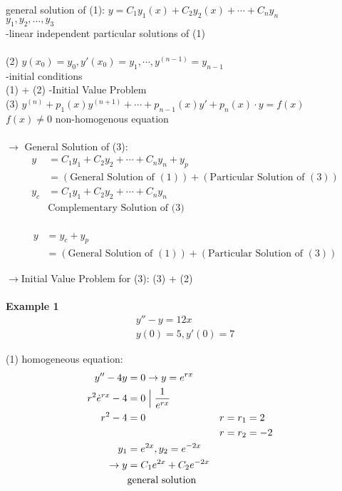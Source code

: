 \documentclass[10pt, letterpaper]{article}
\begin{document}
general solution of (1):
$y =C_1y_1(x) +C_2y_2(x) +\cdots +C_ny_n$\\
$y_1, y_2, \dots, y_3$\\
-linear independent particular solutions of (1)\\
\\
(2) $y(x_0) =y_0, y'(x_0)=y_1, \cdots, y^{(n-1)} =y_{n-1}$\\
-initial conditions\\
(1) + (2) -Initial Value Problem\\
(3) $y^{(n)} +p_1(x)y^{(n+1)} +\cdots +p_{n-1}(x)y' +p_n(x) \cdot y =f(x)$\\
$f(x) \neq 0$ non-homogenous equation\\
\\
$\rightarrow$ General Solution of (3):\\
\begin{align*}
y &= C_1y_1 +C_2y_2 +\cdots +C_ny_n +y_p\\
&= (\text{General Solution of }(1)) + (\text{Particular Solution of } (3))\\
y_c &= C_1y_1 + C_2y_2 +\cdots +C_ny_n\\
&\text{Complementary Solution of (3)}
\end{align*}
\\
\begin{align*}
y &=y_c +y_p\\
&= (\text{General Solution of }(1)) + (\text{Particular Solution of }(3))
\end{align*}

$\rightarrow$Initial Value Problem for (3): (3) + (2)\\
\\
\textbf{Example 1}\\
\begin{align*}
y'' -y =12x\\
y(0) =5 ,y'(0) =7
\end{align*}

(1) homogeneous equation:
\begin{align*}
y'' -4y &= 0 \rightarrow y =e^{rx}\\
r^2 \dot e^{rx} -4 &= 0 \Bigm | \frac{1}{e^{rx}}\\
r^2 -4 &= 0 & r &= r_1 =2\\
& & r &= r_2 = -2\\
y_1 &= e^{2x}, y_2 = e^{-2x}\\
\rightarrow y &= C_1e^{2x} +C_2e^{-2x}\\
&\text{general solution}
\end{align*}
\end{document}
